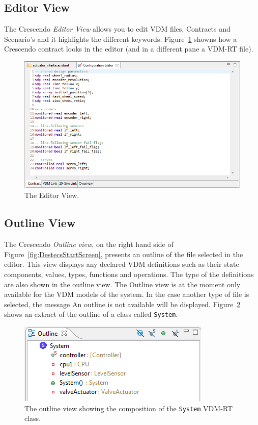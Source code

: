 \documentclass{crescendorepchap}
\begin{document}
\subsection{Editor View}\label{sec:editorview}

The Crescendo \emph{Editor View} allows you to edit VDM files, Contracts and Scenario's and it highlights the different keywords. Figure~\ref{fig:editorcontract1} showns how a Crescendo contract looks in the editor (and in a different pane a VDM-RT file).

\begin{figure}[htbp]
\centering
\includegraphics[width=.6\textwidth]{images/DestecsEditorNewContract.png}
\caption{The Editor View.\label{fig:editorcontract1}}
\end{figure}

\subsection{Outline View}

The Crescendo \emph{Outline view}, on the right hand side of Figure~\ref{fig:DestecsStartScreen}, presents
an outline of the file selected in the editor. This view displays any
declared VDM definitions such as their state components, values, types,
functions and operations. The type of the definitions are also shown in
the outline view. The Outline view is at the moment only available for
the VDM models of the system. In the case another type of file is
selected, the message An outline is not available will be displayed. 
Figure~\ref{fig:outlineview} shows an extract of the outline of a class called \texttt{System}. 

\begin{figure}[htbp]
\centering
\includegraphics[width=.6\textwidth]{images/DestecsOutLineViewSystem.png}
\caption{The outline view showing the composition of the \texttt{System}
VDM-RT class.\label{fig:outlineview}}
\end{figure}
\end{document}
